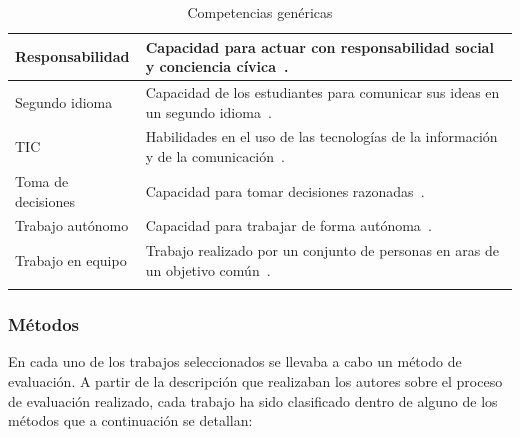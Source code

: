 \begin{landscape}
\begin{center}
\begin{longtable}{| m{6cm} | m{16cm} |}
    \hline
    Responsabilidad & Capacidad para actuar con responsabilidad social y conciencia cívica~\cite{gonzalez2003tuning}. \\
    \hline 
    Segundo idioma & Capacidad de los estudiantes para comunicar sus ideas en un segundo idioma~\cite{gass2013second}. \\
    \hline
    TIC & Habilidades en el uso de las tecnologías de la información y de la comunicación~\cite{gonzalez2003tuning}. \\
    \hline
    Toma de decisiones & Capacidad para tomar decisiones razonadas~\cite{gonzalez2003tuning}. \\
    \hline
    Trabajo autónomo & Capacidad para trabajar de forma autónoma~\cite{gonzalez2003tuning}. \\
    \hline
    Trabajo en equipo & Trabajo realizado por un conjunto de personas en aras de un objetivo común~\cite{dixon1992teamwork}. \\
    \hline
\caption{Competencias genéricas}
\label{tab:CompetenciasGenericas}
\end{longtable} 
\end{center}
\end{landscape}
\pagestyle{fancy}

\subsubsection{Métodos}
\label{sec:methods}
En cada uno de los trabajos seleccionados se llevaba a cabo un método de evaluación. A partir de la descripción que realizaban los autores sobre el proceso de evaluación realizado, cada trabajo ha sido clasificado dentro de alguno de los métodos que a continuación se detallan:

